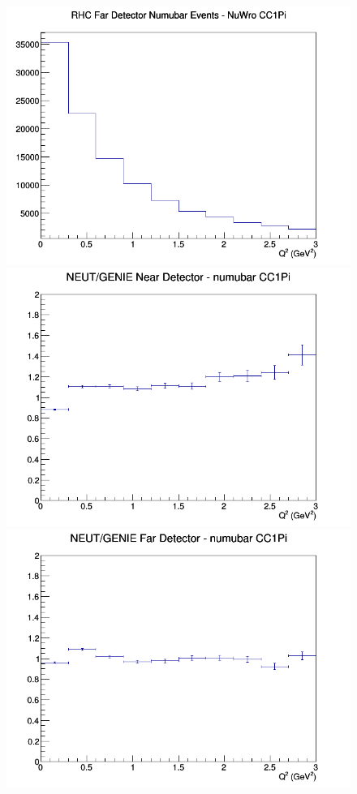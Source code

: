 \begin{figure}[h]
\endminipage
{}
\includegraphics[width=\linewidth]{eff_Q2/GAr/CC1Pi_RHC_FD_numubar_Q2_NuWro.png}
\endminipage
\newline
{}
\includegraphics[width=\linewidth]{eff_Q2/GAr/ratios/CC1Pi_NEUT_GENIE_numubar_near_Q2.png}
\endminipage
{}
\includegraphics[width=\linewidth]{eff_Q2/GAr/ratios/CC1Pi_NEUT_GENIE_numubar_far_Q2.png}

\end{figure}
